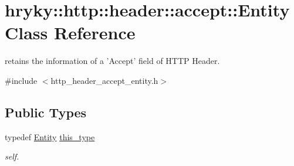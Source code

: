\hypertarget{classhryky_1_1http_1_1header_1_1accept_1_1_entity}{\section{hryky\-:\-:http\-:\-:header\-:\-:accept\-:\-:Entity Class Reference}
\label{classhryky_1_1http_1_1header_1_1accept_1_1_entity}
}


retains the information of a 'Accept' field of H\-T\-T\-P Header.  




{\ttfamily \#include $<$http\-\_\-header\-\_\-accept\-\_\-entity.\-h$>$}

\subsection*{Public Types}
\begin{DoxyCompactItemize}
\item 
\hypertarget{classhryky_1_1http_1_1header_1_1accept_1_1_entity_a09779fe531e8017b8d88ef779e186488}{typedef \hyperlink{classhryky_1_1http_1_1header_1_1accept_1_1_entity}{Entity} \hyperlink{classhryky_1_1http_1_1header_1_1accept_1_1_entity_a09779fe531e8017b8d88ef779e186488}{this\-\_\-type}}\label{classhryky_1_1http_1_1header_1_1accept_1_1_entity_a09779fe531e8017b8d88ef779e186488}

\begin{DoxyCompactList}\small\item\em self. \end{DoxyCompactList}\end{DoxyCompactItemize}
